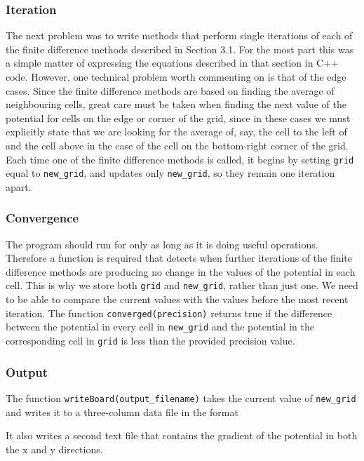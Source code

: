 \documentclass{article}
\begin{document}

\subsubsection{Iteration}
The next problem was to write methods that perform single iterations of each of the finite difference methods described in Section 3.1. For the most part this was a simple matter of expressing the equations described in that section in C++ code. However, one technical problem worth commenting on is that of the edge cases. Since the finite difference methods are based on finding the average of neighbouring cells, great care must be taken when finding the next value of the potential for cells on the edge or corner of the grid, since in these cases we must explicitly state that we are looking for the average of, say, the cell to the left of and the cell above in the case of the cell on the bottom-right corner of the grid. Each time one of the finite difference methods is called, it begins by setting \texttt{grid} equal to \texttt{new\_grid}, and updates only \texttt{new\_grid}, so they remain one iteration apart.


\subsubsection{Convergence}
The program should run for only as long as it is doing useful operations. Therefore a function is required that detects when further iterations of the finite difference methods are producing no change in the values of the potential in each cell. This is why we store both \texttt{grid} and \texttt{new\_grid}, rather than just one. We need to be able to compare the current values with the values before the most recent iteration. The function \texttt{converged(precision)} returns true if the difference between the potential in every cell in \texttt{new\_grid} and the potential in the corresponding cell in \texttt{grid} is less than the provided precision value.

\subsubsection{Output}
The function \texttt{writeBoard(output\_filename)} takes the current value of \texttt{new\_grid} and writes it to a three-column data file in the format


It also writes a second text file that contains the gradient of the potential in both the x and y directions.
\end{document}
